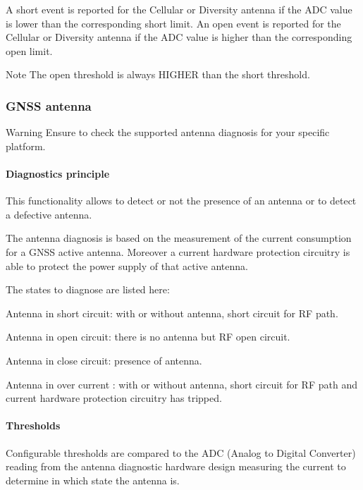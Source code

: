A short event is reported for the Cellular or Diversity antenna if the A\+D\+C value is lower than the corresponding short limit. An open event is reported for the Cellular or Diversity antenna if the A\+D\+C value is higher than the corresponding open limit.

\begin{DoxyNote}{Note}
The open threshold is always H\+I\+G\+H\+E\+R than the short threshold.
\end{DoxyNote}
\hypertarget{c_antenna_le_antenna_gnss_section}{}\subsubsection{G\+N\+S\+S antenna}\label{c_antenna_le_antenna_gnss_section}
\begin{DoxyWarning}{Warning}
Ensure to check the supported antenna diagnosis for your specific platform.
\end{DoxyWarning}
\hypertarget{c_antenna_le_antenna_gnss_diag_subsection}{}\paragraph{Diagnostics principle}\label{c_antenna_le_antenna_gnss_diag_subsection}
This functionality allows to detect or not the presence of an antenna or to detect a defective antenna.

The antenna diagnosis is based on the measurement of the current consumption for a G\+N\+S\+S active antenna. Moreover a current hardware protection circuitry is able to protect the power supply of that active antenna.

The states to diagnose are listed here\+:
\begin{DoxyItemize}
\item Antenna in short circuit\+: with or without antenna, short circuit for R\+F path.
\item Antenna in open circuit\+: there is no antenna but R\+F open circuit.
\item Antenna in close circuit\+: presence of antenna.
\item Antenna in over current \+: with or without antenna, short circuit for R\+F path and current hardware protection circuitry has tripped.
\end{DoxyItemize}\hypertarget{c_antenna_le_antenna_gnss_thre_subsection}{}\paragraph{Thresholds}\label{c_antenna_le_antenna_gnss_thre_subsection}
Configurable thresholds are compared to the A\+D\+C (Analog to Digital Converter) reading from the antenna diagnostic hardware design measuring the current to determine in which state the antenna is.


